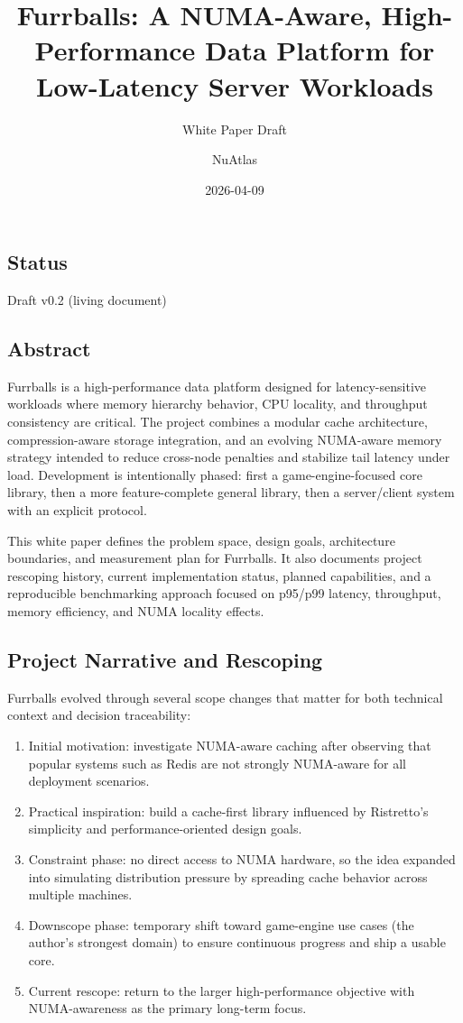 \documentclass[
  english,
  letterpaper,
  DIV=11,
  numbers=noendperiod]{scrartcl}
\title{Furrballs: A NUMA-Aware, High-Performance Data Platform for
Low-Latency Server Workloads}
\subtitle{White Paper Draft}
\author{NuAtlas}
\date{2026-04-09}
\providecommand{\tightlist}{%
  \setlength{\itemsep}{0pt}\setlength{\parskip}{0pt}}
\begin{document}
\maketitle


\subsection{Status}\label{status}

Draft v0.2 (living document)

\subsection{Abstract}\label{abstract}

Furrballs is a high-performance data platform designed for
latency-sensitive workloads where memory hierarchy behavior, CPU
locality, and throughput consistency are critical. The project combines
a modular cache architecture, compression-aware storage integration, and
an evolving NUMA-aware memory strategy intended to reduce cross-node
penalties and stabilize tail latency under load. Development is
intentionally phased: first a game-engine-focused core library, then a
more feature-complete general library, then a server/client system with
an explicit protocol.

This white paper defines the problem space, design goals, architecture
boundaries, and measurement plan for Furrballs. It also documents
project rescoping history, current implementation status, planned
capabilities, and a reproducible benchmarking approach focused on
p95/p99 latency, throughput, memory efficiency, and NUMA locality
effects.

\subsection{Project Narrative and
Rescoping}\label{project-narrative-and-rescoping}

Furrballs evolved through several scope changes that matter for both
technical context and decision traceability:

\begin{enumerate}
\def\labelenumi{\arabic{enumi}.}
\tightlist
\item
  Initial motivation: investigate NUMA-aware caching after observing
  that popular systems such as Redis are not strongly NUMA-aware for all
  deployment scenarios.
\item
  Practical inspiration: build a cache-first library influenced by
  Ristretto's simplicity and performance-oriented design goals.
\item
  Constraint phase: no direct access to NUMA hardware, so the idea
  expanded into simulating distribution pressure by spreading cache
  behavior across multiple machines.
\item
  Downscope phase: temporary shift toward game-engine use cases (the
  author's strongest domain) to ensure continuous progress and ship a
  usable core.
\item
  Current rescope: return to the larger high-performance objective with
  NUMA-awareness as the primary long-term focus.
\end{enumerate}
\end{document}
